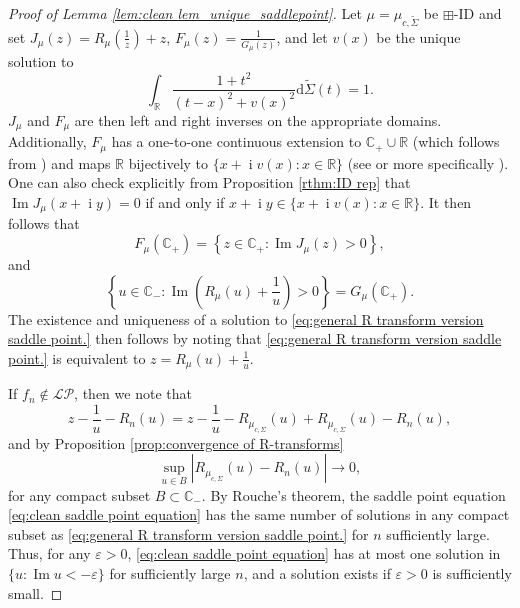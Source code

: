 \documentclass[reqno]{amsart}
\newcommand{\1}{\mathbf{1}}
\newcommand{\dd}{\mathrm{d}}
\DeclareMathOperator{\ii}{i}
\newcommand{\C}{\mathbb{C}}
\renewcommand\Im{\operatorname{Im}}
\newcommand{\eps}{\varepsilon}
\newcommand{\R}{\mathbb{R}}
\def\R{\mathbb{R}}
\newcommand{\LP}{\mathcal{LP}}
\theoremstyle{plain}
\theoremstyle{definition}
\theoremstyle{remark}
\numberwithin{equation}{section}
\begin{document}
\begin{proof}[Proof of Lemma \ref{lem:clean lem_unique_saddlepoint}]
	Let $\mu=\mu_{c,\tilde\Sigma}$ be $\boxplus$-ID %
	and set $J_{\mu}(z)=R_{\mu}(\frac{1}{z})+z$, $F_{\mu}(z)=\frac{1}{G_{\mu}(z)}$, and let $v(x)$ be the unique solution to\begin{equation*}
		\int_{\R}\frac{1+t^2}{(t-x)^2+v(x)^2}\dd\tilde{\Sigma}(t)=1.
	\end{equation*} $J_\mu$ and $F_{\mu}$ are then left and right inverses on the appropriate domains. Additionally, $F_{\mu}$ has a one-to-one continuous extension to $\C_{+}\cup\R$ (which follows from \cite[Theorem 4.6]{Belinschi-Bercovici2005}) and maps $\R$ bijectively to $\{x+\ii v(x):x\in\R\}$ (see \cite{Huang2015} or more specifically \cite[Proposition 2.3]{Bercovici-Wang-Zhong2018}). One can also check explicitly from Proposition \ref{rthm:ID rep} that $\Im J_\mu(x+\ii y)=0$ if and only if $x+\ii y\in\{x+\ii v(x):x\in\R\}$. It then follows that\begin{equation}
	F_{\mu}(\C_{+})=\left\{z\in\C_{+} : \Im J_{\mu}(z)>0 \right\},
	\end{equation} and  \begin{equation}
	\left\{u\in\C_{-} :\Im\left( R_{\mu}(u)+\frac{1}{u}\right)>0 \right\}=G_{\mu}(\C_{+}).
	\end{equation} The existence and uniqueness of a solution to \eqref{eq:general R transform version saddle point.} then follows by noting that \eqref{eq:general R transform version saddle point.} is equivalent to $z=R_{\mu}(u)+\frac{1}{u}$.
	  
	
	 
	If $f_n\notin\LP$, then we note that \begin{equation*}
		z-\frac{1}{u}-R_n(u)=z-\frac{1}{u}-R_{\mu_{c,\Sigma}}(u)+R_{\mu_{c,\Sigma}}(u)-R_n(u),
	\end{equation*} and by Proposition \ref{prop:convergence of R-transforms} \begin{equation}
	\sup_{u\in B}\left|R_{\mu_{c,\Sigma}}(u)-R_{n}(u) \right|\rightarrow0,
	\end{equation}  for any compact subset $B\subset\C_-$. By Rouche's theorem, the saddle point equation \eqref{eq:clean saddle point equation} has the same number of solutions in any compact subset as \eqref{eq:general R transform version saddle point.} for $n$ sufficiently large. Thus, for any $\eps>0$, \eqref{eq:clean saddle point equation} has at most one solution in $\{u:\Im u<-\eps\}$ for sufficiently large $n$, and a solution exists if $\eps>0$ is sufficiently small.
	

\end{proof}
\end{document}
